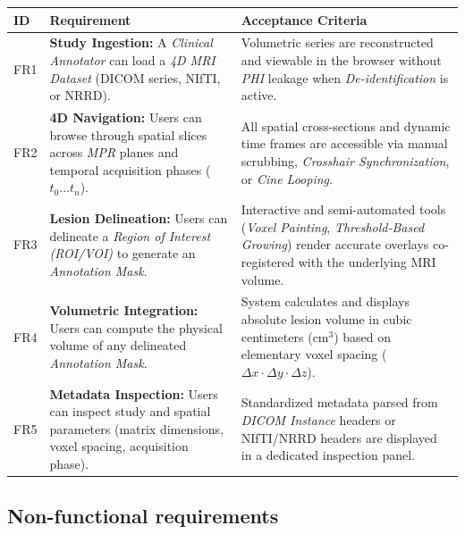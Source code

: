\documentclass[11pt, a4paper]{article}
\begin{document}
\begin{tabularx}{\textwidth}{|l|X|X|}
\hline
ID  & Requirement & Acceptance Criteria \\ \hline
FR1 & \textbf{Study Ingestion:} A \textit{Clinical Annotator} can load a \textit{4D MRI Dataset} (DICOM series, NIfTI, or NRRD). & Volumetric series are reconstructed and viewable in the browser without \textit{PHI} leakage when \textit{De-identification} is active. \\ \hline
FR2 & \textbf{4D Navigation:} Users can browse through spatial slices across \textit{MPR} planes and temporal acquisition phases ($t_0 \dots t_n$). & All spatial cross-sections and dynamic time frames are accessible via manual scrubbing, \textit{Crosshair Synchronization}, or \textit{Cine Looping}. \\ \hline
FR3 & \textbf{Lesion Delineation:} Users can delineate a \textit{Region of Interest (ROI/VOI)} to generate an \textit{Annotation Mask}. & Interactive and semi-automated tools (\textit{Voxel Painting}, \textit{Threshold-Based Growing}) render accurate overlays co-registered with the underlying MRI volume. \\ \hline
FR4 & \textbf{Volumetric Integration:} Users can compute the physical volume of any delineated \textit{Annotation Mask}. & System calculates and displays absolute lesion volume in cubic centimeters ($\text{cm}^3$) based on elementary voxel spacing ($\Delta x \cdot \Delta y \cdot \Delta z$). \\ \hline
FR5 & \textbf{Metadata Inspection:} Users can inspect study and spatial parameters (matrix dimensions, voxel spacing, acquisition phase). & Standardized metadata parsed from \textit{DICOM Instance} headers or NIfTI/NRRD headers are displayed in a dedicated inspection panel. \\ \hline
\end{tabularx}

\subsection{Non-functional requirements}
\end{document}
